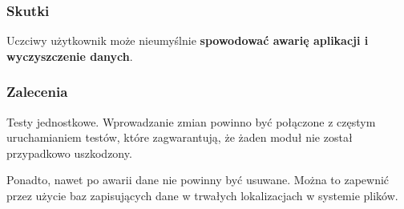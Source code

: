 \subsubsection{Skutki}

Uczciwy użytkownik może nieumyślnie \textbf{spowodować awarię aplikacji i wyczyszczenie danych}.

\subsubsection{Zalecenia}
Testy jednostkowe. Wprowadzanie zmian powinno być połączone z częstym uruchamianiem testów, które zagwarantują, że żaden moduł nie został przypadkowo uszkodzony.

Ponadto, nawet po awarii dane nie powinny być usuwane. Można to zapewnić przez użycie baz zapisujących dane w trwałych lokalizacjach w systemie plików. 
 

